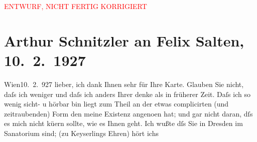 
\begin{center}
            \textcolor{red}{ENTWURF, NICHT FERTIG KORRIGIERT}
                      \end{center}
            
         
         \renewcommand{\erwaehntePersonen}{Personen: Ernst Benedikt, Eduard von Keyserling, Anna Katharina Rehmann, Felix Salten, Theodor Salzmann, Helene Thimig, Adolph von Zsolnay, Amanda von Zsolnay}
         \renewcommand{\erwaehnteOrte}{Orte: Deutschland, Dresden, Sanatorium am Königspark, Wien}
         \renewcommand{\erwaehnteWerke}{Werke: Bambi. Eine Lebensgeschichte aus dem Walde, Martin Overbeck. Der Roman eines reichen jungen Mannes, Neue Freie Presse, Theodor}
               \section[Arthur Schnitzler an Felix Salten, 10. 2. 1927]{ Arthur Schnitzler an Felix Salten, 10. 2. 1927}\nopagebreak{}\rehead{ }\begin{ledgroupsized}[t]{13cm}\normalsize\beginnumbering \toendnotes[C]{\smallbreak\pagebreak[2]} 
\toendnotes[C]{\smallbreak}\pstart
           \raggedleft{}{\pb}Wien10. 2. 927\pend
           \pstart
           lieber, ich dank Ihnen sehr für Ihre Karte. Glauben Sie nicht, daſs
               ich weniger und daſs ich anders Ihrer denke als in früherer Zeit. Daſs ich so wenig
               sicht- u hörbar bin liegt zum Theil an der etwas complicirten (und zeitraubenden)
                  Form\strikeout{)} den meine Existenz angeno{\geminationm}en hat; und gar nicht daran, dſs  es mich nicht kü{\geminationm}ern
               sollte, wie es Ihnen geht. Ich wußte dſs Sie in Dresden im Sanatorium\strikeout{\textcolor{gray}{×}\-\textcolor{gray}{×}\-\textcolor{gray}{×}\-\textcolor{gray}{×}} sind; \label{K_L03022-1v}\label{K_L03022-1h} (zu Keyserlings Ehren) hört ichs

\end{ledgroupsized}
